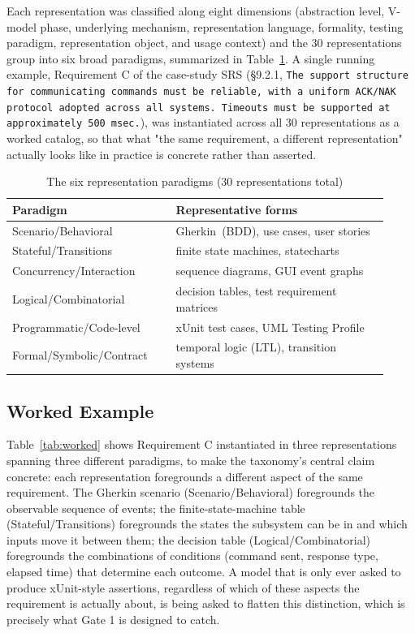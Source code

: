 \documentclass[conference]{IEEEtran}
\begin{document}
  Each representation was classified along eight dimensions (abstraction level,
  V-model phase, underlying mechanism, representation language, formality,
  testing paradigm, representation object, and usage context) and the 30
  representations group into six broad paradigms, summarized in
  Table~\ref{tab:paradigms}. A single running example, Requirement C of the
  case-study SRS (\S9.2.1, \texttt{The support structure for communicating commands
  must be reliable, with a uniform ACK/NAK protocol adopted across all systems.
  Timeouts must be supported at approximately 500 msec.}), was instantiated
  across all 30 representations as a worked catalog, so that what "the same
  requirement, a different representation" actually looks like in practice is
  concrete rather than asserted.

  \begin{table}[t]
  \centering
  \caption{The six representation paradigms (30 representations total)}
  \label{tab:paradigms}
  \small
  \begin{tabular}{@{}p{0.40\linewidth}p{0.52\linewidth}@{}}
  \toprule
  \textbf{Paradigm} & \textbf{Representative forms} \\
  \midrule
  Scenario/Behavioral & Gherkin~(BDD), use cases, user stories \\
  Stateful/Transitions & finite state machines, statecharts \\
  Concurrency/Interaction & sequence diagrams, GUI event graphs \\
  Logical/Combinatorial & decision tables, test requirement matrices \\
  Programmatic/Code-level & xUnit test cases, UML Testing Profile \\
  Formal/Symbolic/Contract & temporal logic (LTL), transition systems \\
  \bottomrule
  \end{tabular}
  \end{table}

  \subsection{Worked Example}
  \label{sec:worked}
  Table~\ref{tab:worked} shows Requirement C instantiated in three
  representations spanning three different paradigms, to make the taxonomy's
  central claim concrete: each representation foregrounds a different aspect of
  the same requirement. The Gherkin scenario (Scenario/Behavioral) foregrounds
  the observable sequence of events; the finite-state-machine table
  (Stateful/Transitions) foregrounds the states the subsystem can be in and
  which inputs move it between them; the decision table (Logical/Combinatorial)
  foregrounds the combinations of conditions (command sent, response type,
  elapsed time) that determine each outcome. A model that is only ever asked to
  produce xUnit-style assertions, regardless of which of these aspects the
  requirement is actually about, is being asked to flatten this distinction,
  which is precisely what Gate 1 is designed to catch.
\end{document}
